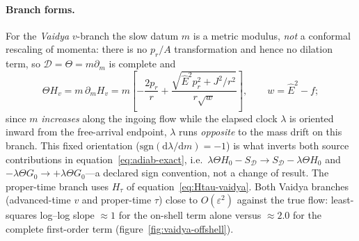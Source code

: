 \documentclass[12pt]{iopart}
\newcommand{\Ehat}{\hat E}
\newcommand{\dd}{\mathrm{d}}
\theoremstyle{plain}
\theoremstyle{definition}
\theoremstyle{plain}
\theoremstyle{remark}
\begin{document}
\paragraph{Branch forms.} For the \emph{Vaidya} $v$-branch the slow datum $m$ is a metric
modulus, \emph{not} a conformal rescaling of momenta: there is no $p_r/A$ transformation
and hence no dilation term, so $\mathcal D=\Theta=m\partial_m$ is complete and
\begin{equation}
    \Theta H_v=m\,\partial_m H_v
    =m\!\left[-\frac{2p_r}{r}+\frac{\sqrt{\Ehat^2p_r^2+J^2/r^2}}{r\sqrt w}\right],
    \qquad w=\Ehat^2-f;
    \label{eq:ThetaHv}
\end{equation}
since $m$ \emph{increases} along the ingoing flow while the elapsed clock $\lambda$ is
oriented inward from the free-arrival endpoint, $\lambda$ runs \emph{opposite} to the mass
drift on this branch. This fixed orientation ($\mathrm{sgn}(\dd\lambda/\dd m)=-1$) is what
inverts both source contributions in equation~\eqref{eq:adiab-exact}, i.e.\
$\lambda\Theta H_0-S_{\mathcal D}\to S_{\mathcal D}-\lambda\Theta H_0$ and
$-\lambda\Theta G_0\to+\lambda\Theta G_0$---a declared sign convention, not a change of
result. The proper-time branch uses $H_\tau$ of equation~\eqref{eq:Htau-vaidya}. Both Vaidya branches (advanced-time $v$ and proper-time
$\tau$) close to $O(\varepsilon^2)$ against the true flow: least-squares log--log slope
$\approx1$ for the on-shell term alone versus $\approx2.0$ for the complete first-order
term (figure~\ref{fig:vaidya-offshell}).
\end{document}
